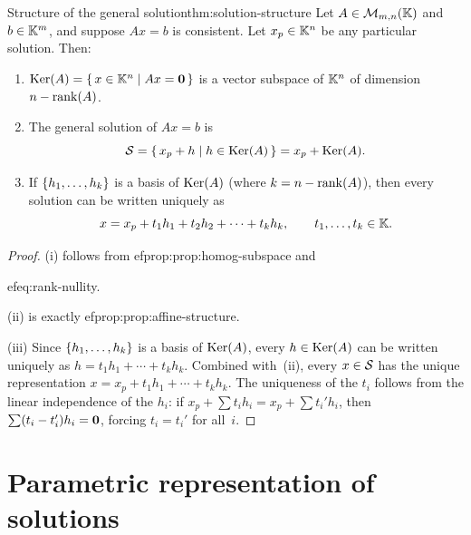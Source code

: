 \begin{theorem}{Structure of the general solution}{thm:solution-structure}
Let $A\in\mathcal{M}_{m,n}({\mathbb{K}})$ and $b\in{\mathbb{K}}^m$, and suppose $Ax=b$ is
consistent. Let $x_p\in{\mathbb{K}}^n$ be any particular solution. Then:
\begin{enumerate}[label=(\roman*)]
  \item $\operatorname{Ker}(A) = \left\{\,x\in{\mathbb{K}}^n\;\middle|\;Ax = \mathbf{0}\,\right\}$ is a vector
    subspace of ${\mathbb{K}}^n$ of dimension $n - \operatorname{rank}(A)$.
  \item The general solution of $Ax = b$ is
    \begin{equation}\label{eq:gen-sol}
      {\mathcal{S}} = \left\{\,x_p + h\;\middle|\;h\in\operatorname{Ker}(A)\,\right\} = x_p + \operatorname{Ker}(A).
    \end{equation}
  \item If $\left\{h_1, \dots, h_k\right\}$ is a basis of $\operatorname{Ker}(A)$ (where
    $k = n - \operatorname{rank}(A)$), then every solution can be written uniquely as
    \begin{equation}\label{eq:parametric-sol}
      x = x_p + t_1 h_1 + t_2 h_2 + \cdots + t_k h_k,
      \qquad t_1, \dots, t_k \in {\mathbb{K}}.
    \end{equation}
\end{enumerate}
\end{theorem}

\begin{proof}
(i) follows from 
ef{prop:prop:homog-subspace} and

ef{eq:rank-nullity}.

(ii) is exactly 
ef{prop:prop:affine-structure}.

(iii) Since $\left\{h_1,\dots,h_k\right\}$ is a basis of $\operatorname{Ker}(A)$, every
$h\in\operatorname{Ker}(A)$ can be written uniquely as $h = t_1 h_1 + \cdots +
t_k h_k$. Combined with~(ii), every $x\in{\mathcal{S}}$ has the unique
representation $x = x_p + t_1 h_1 + \cdots + t_k h_k$.
The uniqueness of the $t_i$ follows from the linear independence of
the $h_i$: if $x_p + \sum t_i h_i = x_p + \sum t_i' h_i$, then
$\sum (t_i - t_i') h_i = \mathbf{0}$, forcing $t_i = t_i'$ for all~$i$.
\end{proof}


\section{Parametric representation of solutions}%
\label{sec:parametric}


